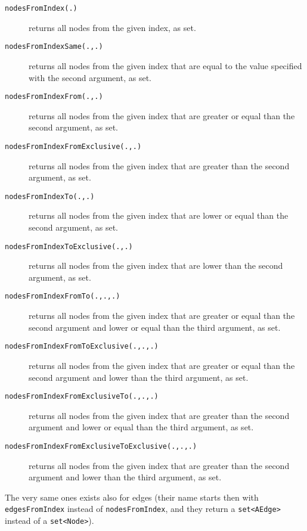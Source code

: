 \begin{description}
\item[\texttt{nodesFromIndex(.)}] returns all nodes from the given index, as set.
\item[\texttt{nodesFromIndexSame(.,.)}] returns all nodes from the given index that are equal to the value specified with the second argument, as set.
\item[\texttt{nodesFromIndexFrom(.,.)}] returns all nodes from the given index that are greater or equal than the second argument, as set.
\item[\texttt{nodesFromIndexFromExclusive(.,.)}] returns all nodes from the given index that are greater than the second argument, as set.
\item[\texttt{nodesFromIndexTo(.,.)}] returns all nodes from the given index that are lower or equal than the second argument, as set.
\item[\texttt{nodesFromIndexToExclusive(.,.)}] returns all nodes from the given index that are lower than the second argument, as set.
\item[\texttt{nodesFromIndexFromTo(.,.,.)}] returns all nodes from the given index that are greater or equal than the second argument and lower or equal than the third argument, as set.
\item[\texttt{nodesFromIndexFromToExclusive(.,.,.)}] returns all nodes from the given index that are greater or equal than the second argument and lower than the third argument, as set.
\item[\texttt{nodesFromIndexFromExclusiveTo(.,.,.)}] returns all nodes from the given index that are greater than the second argument and lower or equal than the third argument, as set.
\item[\texttt{nodesFromIndexFromExclusiveToExclusive(.,.,.)}] returns all nodes from the given index that are greater than the second argument and lower than the third argument, as set.
\end{description}

The very same ones exists also for edges (their name starts then with \texttt{edgesFromIndex} instead of \texttt{nodesFromIndex}, and they return a \texttt{set<AEdge>} instead of a \texttt{set<Node>}).

